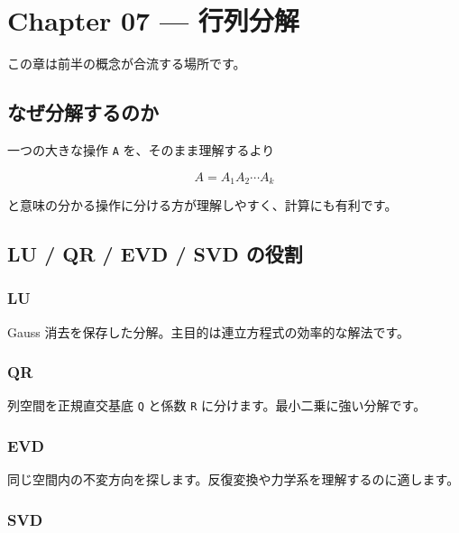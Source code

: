 \documentclass[
  11pt,
  a4paper,
]{ltjsarticle}
\author{}
\date{}
\begin{document}
\hypertarget{chapter-07-ux884cux5217ux5206ux89e3}{%
\section{Chapter 07 ---
行列分解}\label{chapter-07-ux884cux5217ux5206ux89e3}}

この章は前半の概念が合流する場所です。

\hypertarget{ux306aux305cux5206ux89e3ux3059ux308bux306eux304b}{%
\subsection{なぜ分解するのか}\label{ux306aux305cux5206ux89e3ux3059ux308bux306eux304b}}

一つの大きな操作 \texttt{A} を、そのまま理解するより

\[
A=A_1A_2\cdots A_k
\]

と意味の分かる操作に分ける方が理解しやすく、計算にも有利です。

\hypertarget{lu-qr-evd-svd-ux306eux5f79ux5272}{%
\subsection{LU / QR / EVD / SVD
の役割}\label{lu-qr-evd-svd-ux306eux5f79ux5272}}

\hypertarget{lu}{%
\subsubsection{LU}\label{lu}}

Gauss 消去を保存した分解。主目的は連立方程式の効率的な解法です。

\hypertarget{qr}{%
\subsubsection{QR}\label{qr}}

列空間を正規直交基底 \texttt{Q} と係数 \texttt{R}
に分けます。最小二乗に強い分解です。

\hypertarget{evd}{%
\subsubsection{EVD}\label{evd}}

同じ空間内の不変方向を探します。反復変換や力学系を理解するのに適します。

\hypertarget{svd}{%
\subsubsection{SVD}\label{svd}}
\end{document}
